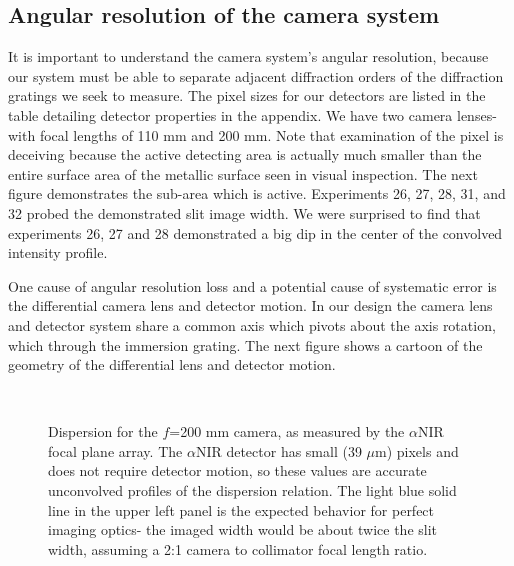 \subsection{Angular resolution of the camera system}
It is important to understand the camera system's angular resolution, because our system must be able to separate adjacent diffraction orders of the diffraction gratings we seek to measure.  The pixel sizes for our detectors are listed in the table detailing detector properties in the appendix.  We have two camera lenses- with focal lengths of 110 mm and 200 mm.  Note that examination of the pixel is deceiving because the active detecting area is actually much smaller than the entire surface area of the metallic surface seen in visual inspection.  The next figure demonstrates the sub-area which is active.  Experiments 26, 27, 28, 31, and 32 probed the demonstrated slit image width.  We were surprised to find that experiments 26, 27 and 28 demonstrated a big dip in the center of the convolved intensity profile.

One cause of angular resolution loss and a potential cause of systematic error is the differential camera lens and detector motion.  In our design the camera lens and detector system share a common axis which pivots about the axis rotation, which through the immersion grating.  The next figure shows a cartoon of the geometry of the differential lens and detector motion.

\begin{figure}
  \centering
   \\ 
  \caption[Dispersion for $f$=200 mm camera]{Dispersion for the $f$=200 mm camera, as measured by the $\alpha$NIR focal plane array.  The $\alpha$NIR detector has small (39 $\mu$m) pixels and does not require detector motion, so these values are accurate unconvolved profiles of the dispersion relation.  The light blue solid line in the upper left panel is the expected behavior for perfect imaging optics- the imaged width would be about twice the slit width, assuming a 2:1 camera to collimator focal length ratio.}
\end{figure}


